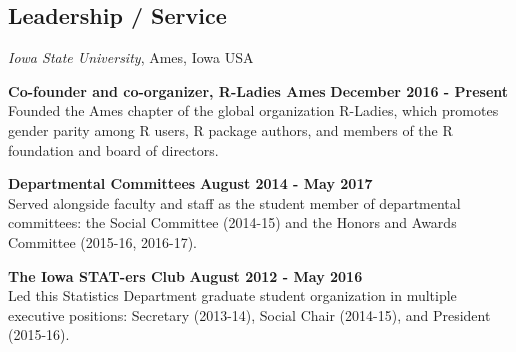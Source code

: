 \documentclass[margin,line]{res}
\begin{document}
\begin{resume}
\section{\sc Leadership / Service}

{\em Iowa State University}, Ames, Iowa USA

\vspace{-.3cm}

{\bf Co-founder and co-organizer, R-Ladies Ames} \hfill {\bf December 2016 - Present}\\
Founded the Ames chapter of the global organization R-Ladies, which promotes gender parity among R users, R package authors, and members of the R foundation and board of directors. 

\vspace{-.3cm}

{\bf Departmental Committees} \hfill {\bf August 2014 - May 2017}\\
Served alongside faculty and staff as the student member of departmental committees: the Social Committee (2014-15) and the Honors and Awards Committee (2015-16, 2016-17). 

\vspace{-.3cm}

{\bf The Iowa STAT-ers Club} \hfill {\bf August 2012 - May 2016}\\
Led this Statistics Department graduate student organization in multiple executive positions: Secretary (2013-14), Social Chair (2014-15), and President (2015-16).


\end{resume}
\end{document}
